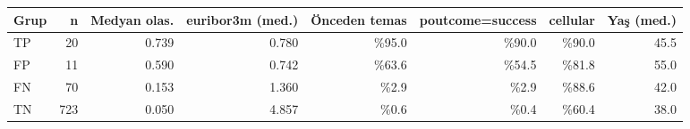 \begin{tabular}{lrrrrrrr}\toprule
Grup & n & Medyan olas. & euribor3m (med.) & Önceden temas & poutcome=success & cellular & Yaş (med.) \\\midrule
TP & 20 & 0.739 & 0.780 & \%95.0 & \%90.0 & \%90.0 & 45.5 \\
FP & 11 & 0.590 & 0.742 & \%63.6 & \%54.5 & \%81.8 & 55.0 \\
FN & 70 & 0.153 & 1.360 & \%2.9 & \%2.9 & \%88.6 & 42.0 \\
TN & 723 & 0.050 & 4.857 & \%0.6 & \%0.4 & \%60.4 & 38.0 \\
\bottomrule\end{tabular}